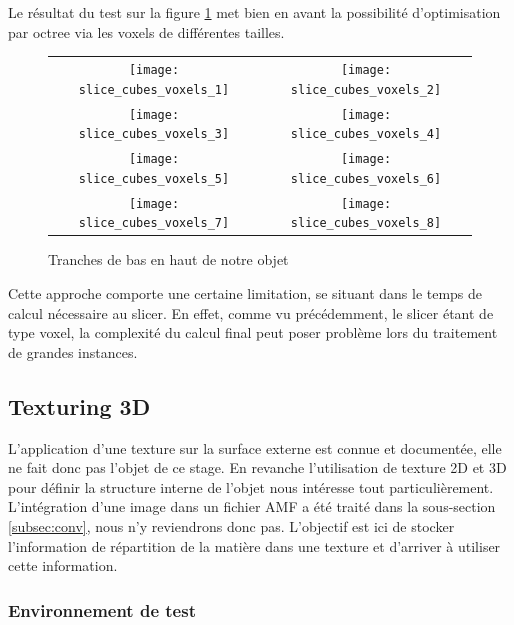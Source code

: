 \documentclass{tnreport}
\begin{document}
Le résultat du test sur la figure \ref{fig:slicevoxels} met bien en avant la possibilité d'optimisation par octree via les voxels de différentes tailles.  
\begin{figure}[htb]
\centering
  \begin{tabular}{@{}cc@{}}
    \texttt{[image: slice\_cubes\_voxels\_1]} &
    \texttt{[image: slice\_cubes\_voxels\_2]} \\
    \texttt{[image: slice\_cubes\_voxels\_3]} &
    \texttt{[image: slice\_cubes\_voxels\_4]} \\
    \texttt{[image: slice\_cubes\_voxels\_5]} &
    \texttt{[image: slice\_cubes\_voxels\_6]} \\
    \texttt{[image: slice\_cubes\_voxels\_7]} &
    \texttt{[image: slice\_cubes\_voxels\_8]} \\
  \end{tabular}
  \caption{Tranches de bas en haut de notre objet}
  \label{fig:slicevoxels}
\end{figure}
Cette approche comporte une certaine limitation, se situant dans le temps de calcul nécessaire au slicer. En effet, comme vu précédemment, le slicer étant de type voxel, la complexité du calcul final peut poser problème lors du traitement de grandes instances. 

\clearpage
\subsection{Texturing 3D}
\label{subsec:tex3D}
L'application d'une texture sur la surface externe est connue et documentée, elle ne fait donc pas l'objet de ce stage. En revanche l'utilisation de texture 2D et 3D pour définir la structure interne de l'objet nous intéresse tout particulièrement. L'intégration d'une image dans un fichier AMF a été traité dans la sous-section \ref{subsec:conv}, nous n'y reviendrons donc pas. L'objectif est ici de stocker l'information de répartition de la matière dans une texture et d'arriver à utiliser cette information. 

\subsubsection{Environnement de test}
\end{document}
